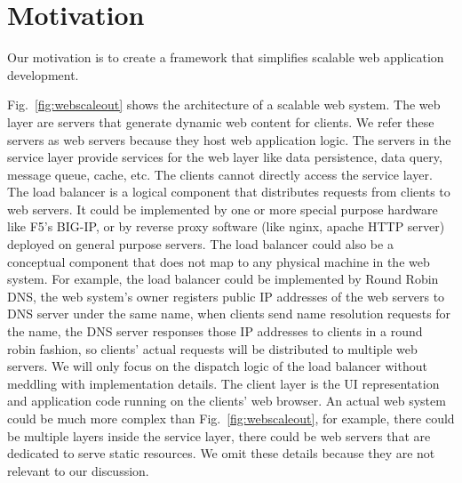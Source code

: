 \section{Motivation}
\label{sec:moti}

Our motivation is to create a framework that simplifies scalable web application
development.



\webscaleout{}

Fig.~\ref{fig:webscaleout} shows the architecture of a scalable web system.
The web layer are servers that generate dynamic web content for clients.
We refer these servers as web servers because they host web application
logic.
The servers in the service layer provide services for the web layer
like data persistence, data query, message queue, cache, etc. 
The clients cannot directly access the service layer.
The load balancer is a logical component that 
distributes requests from clients to web servers.
It could be implemented by one or more special purpose hardware like F5's BIG-IP,
or by reverse proxy software (like nginx, apache HTTP server) deployed on general
purpose servers.
The load balancer could also be a conceptual component that does not map to 
any physical machine in the web system.
For example, 
the load balancer could be implemented by Round Robin DNS,
the web system's owner registers public IP addresses of the web servers
to DNS server under the same name,
when clients send name resolution requests for the name,
the DNS server responses those IP addresses to clients in a round robin fashion,
so clients' actual requests will be distributed to multiple web servers.
We will only focus on the dispatch logic of the load balancer without meddling with
implementation details.
The client layer is the UI representation and application code running on the
clients' web browser.
An actual web system could be much more complex than Fig.~\ref{fig:webscaleout},
for example, there could be multiple layers inside the service layer,
there could be web servers that are dedicated to serve static resources.
We omit these details because they are not relevant to our discussion.

